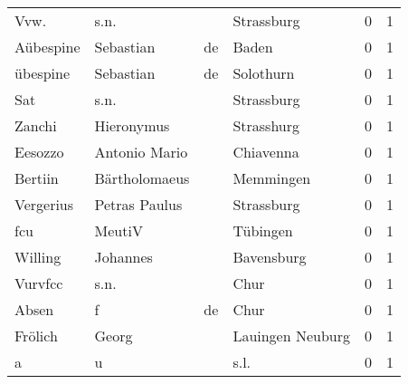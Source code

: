 \begin{tabular}{llllrr}
                     Vvw. &                               s.n. &             &                                  Strassburg &          0 &         1 \\
                Aübespine &                          Sebastian &          de &                                       Baden &          0 &         1 \\
                 übespine &                          Sebastian &          de &                                   Solothurn &          0 &         1 \\
                      Sat &                               s.n. &             &                                  Strassburg &          0 &         1 \\
                   Zanchi &                         Hieronymus &             &                                  Strasshurg &          0 &         1 \\
                  Eesozzo &                      Antonio Mario &             &                                   Chiavenna &          0 &         1 \\
                  Bertiin &                      Bärtholomaeus &             &                                   Memmingen &          0 &         1 \\
                Vergerius &                      Petras Paulus &             &                                  Strassburg &          0 &         1 \\
                      fcu &                             MeutiV &             &                                    Tübingen &          0 &         1 \\
                  Willing &                           Johannes &             &                                  Bavensburg &          0 &         1 \\
                  Vurvfcc &                               s.n. &             &                                        Chur &          0 &         1 \\
                    Absen &                                  f &          de &                                        Chur &          0 &         1 \\
                  Frölich &                              Georg &             &                            Lauingen Neuburg &          0 &         1 \\
                        a &                                  u &             &                                        s.l. &          0 &         1 \\

\end{tabular}
